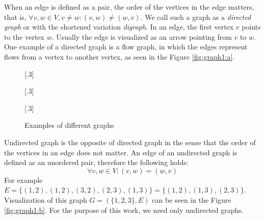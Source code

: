 When an edge is defined as a pair, the order of the vertices in the edge matters, that is, $\forall v, w \in V, v \neq w: (v, w) \neq (w, v)$.
We call such a graph as a \emph{directed graph} or with the shortened variation \emph{digraph}.
In an edge, the first vertex $v$ points to the vertex $w$.
Usually the edge is visualized as an arrow pointing from $v$ to $w$.
One example of a directed graph is a flow graph, in which the edges represent flows from a vertex to another vertex, as seen in the Figure \ref{fig:graph1:a}.

\begin{figure}[H]
    [.3\linewidth] {
    \centering
  }
  \hfill
    [.3\linewidth] {
    \centering
  }
  \hfill
    [.3\linewidth] {
    \centering
  }
  \caption{Examples of different graphs}
  \label{fig:graph1}
\end{figure}

Undirected graph is the opposite of directed graph in the sense that the order of the vertices in an edge does not matter.
An edge of an undirected graph is defined as an unordered pair, therefore the following holds:
\begin{equation}
\forall v, w \in V: (v, w) = (w, v)
\end{equation}
For example $E=\{(1, 2), (1, 2), (3, 2), (2, 3), (1, 3)\}=\{(1,2),(1,3),(2,3)\}$.
Visualization of this graph $G=(\{1,2,3\}, E)$ can be seen in the Figure \ref{fig:graph1:b}.
For the purpose of this work, we need only undirected graphs.

